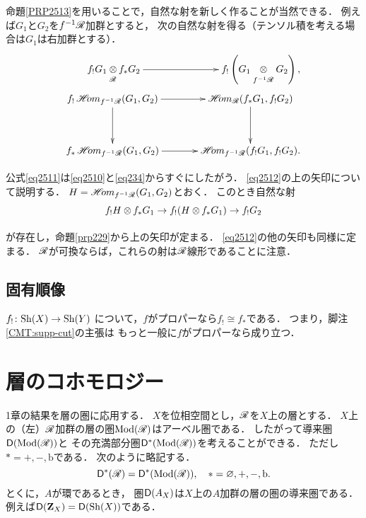 命題\ref{PRP2513}を用いることで，自然な射を新しく作ることが当然できる．
例えば\(G_1\)と\(G_2\)を\(f^{-1}\mathscr{R}\)加群とすると，
次の自然な射を得る（テンソル積を考える場合は\(G_1\)は右加群とする）．
\begin{align}
    \vcenter{\xymatrix@C=76pt@R=36pt{\displaystyle
        f_{!}G_1\ttens[\scR]f_{\ast}G_2
        \ar[r]^-{}
        &\displaystyle
        f_{!}\left(G_1\ttens[f^{-1}\scR]G_2\right),
    }}\label{eq2511}\\
    \vcenter{\xymatrix@C=36pt@R=36pt{
            f_{!}\HOM_{f^{-1}\scR}(G_1,G_2)
            \ar[r]^-{}
            \ar[d]_-{}
            &
            \HOM_{\scR}(f_{\ast}G_1,f_{!}G_2)
            \ar[d]^-{}
            \\
            f_{\ast}\HOM_{f^{-1}\scR}(G_1,G_2)
            \ar[r]_-{}
            &
            \HOM_{f^{-1}\scR}(f_{!}G_1,f_{!}G_2).
    }}\label{eq2512}
\end{align}

公式\eqref{eq2511}は\eqref{eq2510}と\eqref{eq234}からすぐにしたがう．
\eqref{eq2512}の上の矢印について説明する．
\(H=\mathop{\mathscr{H}\hspace{-2pt}om}\nolimits_{f^{-1}\mathscr{R}}(G_1,G_2)\)とおく．
このとき自然な射\[
    f_{!}H\ttens[]f_{\ast}G_{1}\to
    f_{!}(H\ttens[]f_{\ast}G_{1})\to
    f_{!}G_2
\]が存在し，命題\ref{prp229}から上の矢印が定まる．
\eqref{eq2512}の他の矢印も同様に定まる．
\(\mathscr{R}\)が可換ならば，これらの射は\(\mathscr{R}\)線形であることに注意．




















\subsection{固有順像}\label{ssec:pdimg}

\(f_!\colon\mathrm{Sh}(X)\to\mathrm{Sh}(Y)\)
について，\(f\)がプロパーなら\(f_!\cong f_\ast\)である．
つまり，脚注 \ref{CMT:supp-cut}の主張は
もっと一般に\(f\)がプロパーなら成り立つ．



\section{層のコホモロジー}
1章の結果を層の圏に応用する．
\(X\)を位相空間とし，\(\mathscr{R}\)を\(X\)上の層とする．
\(X\)上の（左）\(\mathscr{R}\)加群の層の圏\(\mathop{\mathrm{Mod}}\nolimits(\mathscr{R})\)はアーベル圏である．
したがって導来圏\(\mathsf{D}(\mathop{\mathrm{Mod}}\nolimits(\mathscr{R}))\)と
その充満部分圏\(\mathsf{D}^{\ast}(\mathop{\mathrm{Mod}}\nolimits(\mathscr{R}))\)を考えることができる．
ただし\(\ast=+,-,\mathrm{b}\)である．
次のように略記する．
\begin{equation}
    \mathsf{D}^{\ast}(\mathscr{R})=\mathsf{D}^{\ast}(\mathop{\mathrm{Mod}}\nolimits(\mathscr{R})), \quad \ast=\varnothing,+,-,\mathrm{b}.
\end{equation}
とくに，\(A\)が環であるとき，
圏\(\mathsf{D}(A_X)\)は\(X\)上の\(A\)加群の層の圏の導来圏である．
例えば\(\mathsf{D}(\mathbf{Z}_X)=\mathsf{D}(\mathrm{Sh}(X))\)である．


